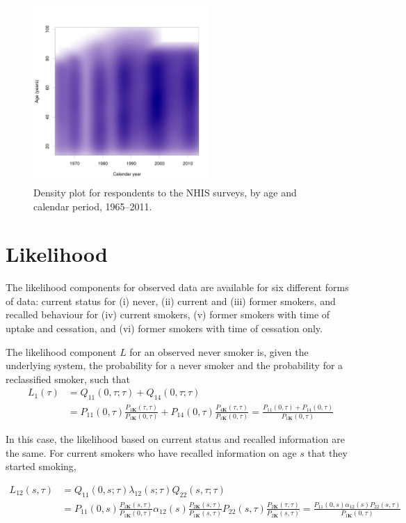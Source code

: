 \documentclass[11pt,a4paper]{article}
\newcommand{\K}{\ensuremath{\bm{K}}}
\begin{document}
\begin{figure}[ht]
  \centering
  \includegraphics[width=0.6\textwidth]{nhis_density.jpg}    
  \caption{Density plot for respondents to the NHIS surveys, by age and calendar period, 1965--2011.}
  \label{fig:nhis}
\end{figure}


\section{Likelihood}

The likelihood components for observed data are available for six
different forms of data: current status for (i) never, (ii) current
and (iii) former smokers, and recalled behaviour for (iv) current
smokers, (v) former smokers with time of uptake and cessation, and
(vi) former smokers with time of cessation only.  

The likelihood component $L$ for an observed never smoker is, given the underlying system, the 
probability for a never smoker and the probability for a reclassified smoker, such that
\begin{align*}
L_1(\tau) & = Q_{11}(0,\tau;\tau)+Q_{14}(0,\tau;\tau) \\
& = P_{11}(0,\tau)\frac{P_{1\K}(\tau,\tau)}{P_{1\K}(0,\tau)} +P_{14}(0,\tau)\frac{P_{4\K}(\tau,\tau)}{P_{1\K}(0,\tau)} 
= \frac{P_{11}(0,\tau)+P_{14}(0,\tau)}{P_{1\K}(0,\tau)}  
\end{align*}

In this case, the likelihood based on current status and recalled information are the same.
For current smokers who have recalled information on age $s$ that they started smoking,

\begin{align*}
L_{12}(s,\tau) & = Q_{11}(0,s;\tau)\lambda_{12}(s;\tau)Q_{22}(s,\tau;\tau) \\
& = P_{11}(0,s)\frac{P_{1\K}(s,\tau)}{P_{1\K}(0,\tau)} 
\alpha_{12}(s) \frac{P_{2\K}(s,\tau)}{P_{1\K}(s,\tau)}
P_{22}(s,\tau)\frac{P_{2\K}(\tau,\tau)}{P_{2\K}(s,\tau)}
 = \frac{P_{11}(0,s)\alpha_{12}(s)P_{22}(s,\tau)}{P_{1\K}(0,\tau)}
\end{align*}
\end{document}
